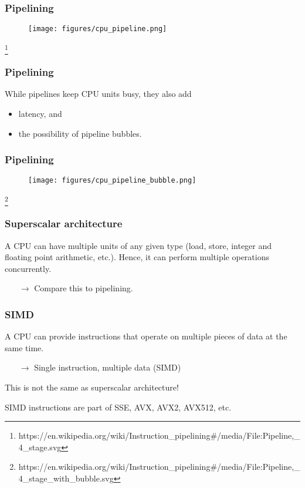 \documentclass[12pt,t]{beamer}
\newcommand\blfootnote[1]{%
  \begingroup
  \renewcommand\thefootnote{}\footnote{\tiny #1}%
  \addtocounter{footnote}{-1}%
  \endgroup
}
\newcommand{\conclude}[1]{%
  \begin{itemize}
    \item[$\rightarrow$]#1
  \end{itemize}
}
\begin{document}
  \begin{frame}[fragile]
    \frametitle{Pipelining}

    \begin{figure}
      \centering
      \texttt{[image: figures/cpu\_pipeline.png]}
    \end{figure}
    \blfootnote{https://en.wikipedia.org/wiki/Instruction\_pipelining\#/media/File:Pipeline,\_4\_stage.svg}
  \end{frame}

  \begin{frame}[fragile]
    \frametitle{Pipelining}

    While pipelines keep CPU units busy, they also add
    \begin{itemize}
      \item latency, and
      \item the possibility of pipeline bubbles.
    \end{itemize}
  \end{frame}

  \begin{frame}[fragile]
    \frametitle{Pipelining}

    \begin{figure}
      \centering
      \texttt{[image: figures/cpu\_pipeline\_bubble.png]}
    \end{figure}
    \blfootnote{https://en.wikipedia.org/wiki/Instruction\_pipelining\#/media/File:Pipeline,\_4\_stage\_with\_bubble.svg}
  \end{frame}

  \begin{frame}[fragile]
    \frametitle{Superscalar architecture}

    A CPU can have multiple units of any given type (load, store, integer and floating point arithmetic, etc.).
    Hence, it can perform multiple operations concurrently.

    \conclude{Compare this to pipelining.}
  \end{frame}

  \begin{frame}[fragile]
    \frametitle{SIMD}

    A CPU can provide instructions that operate on multiple pieces of data at the same time.
    \conclude {Single instruction, multiple data (SIMD)}

    This is not the same as superscalar architecture!

    SIMD instructions are part of SSE, AVX, AVX2, AVX512, etc.
  \end{frame}
\end{document}
